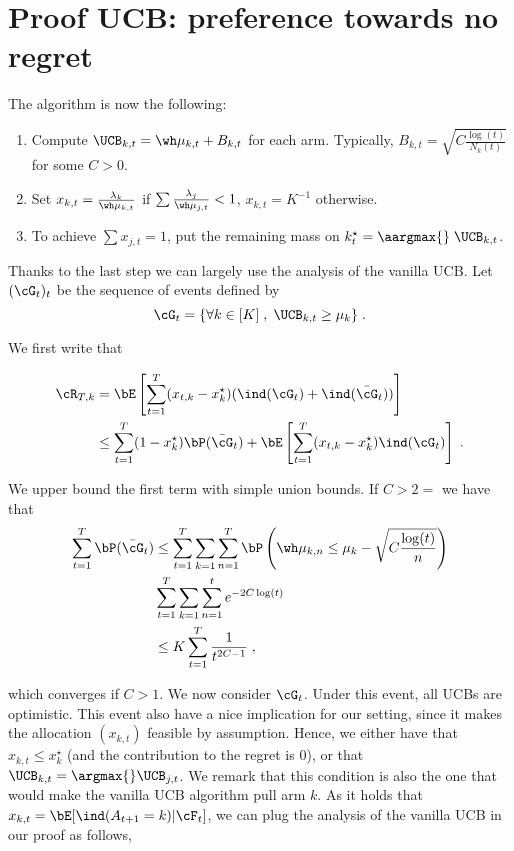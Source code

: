 \section{Proof UCB: preference towards no regret}

The algorithm is now the following:
\begin{enumerate}
	\item Compute $\UCB_{k, t} = \wh \mu_{k, t} + B_{k, t}$ for each arm. Typically, $B_{k, t}=\sqrt{C\frac{\log(t)}{N_k(t)}}$ for some $C>0$.
	\item Set $x_{k,t} = \frac{\lambda_k}{\wh \mu_{k, t}}$ if $\sum \frac{\lambda_j}{\wh \mu_{j, t}}<1$, $x_{k, t}=K^{-1}$ otherwise.
	\item To achieve $\sum x_{j, t}=1$, put the remaining mass on $k_t^\star=\aargmax{} \; \UCB_{k, t}$.
\end{enumerate}

Thanks to the last step we can largely use the analysis of the vanilla UCB. Let $(\cG_t)_t$ be the sequence of events defined by 
\[\cG_t = \{\forall k \in [K]\;, \; \UCB_{k, t}\geq \mu_k\} \;. \]

We first write that

\begin{align*}
\cR_{T,k} &= \bE\left[\sum_{t=1}^T (x_{t, k} - x^\star_k)(\ind(\cG_t)+\ind(\bar \cG_t))\right] \\
& \leq \sum_{t=1}^T (1-x_k^\star) \bP(\bar \cG_t) + \bE\left[\sum_{t=1}^T (x_{t,k} - x_k^\star)\ind(\cG_t)\right] \;.
\end{align*}

We upper bound the first term with simple union bounds. If $C>2=$ we have that 
\begin{align*}
\sum_{t=1}^T \bP(\bar \cG_t) &\leq \sum_{t=1}^T \sum_{k=1} \sum_{n=1}^{T}\bP\left(\wh \mu_{k,n}\leq \mu_k - \sqrt{C\frac{\log(t)}{n}}\right) \\
& \sum_{t=1}^T \sum_{k=1} \sum_{n=1}^{t}e^{-2C \log(t)} \\
& \leq K\sum_{t=1}^T \frac{1}{t^{2C-1}}\;,
\end{align*}

which converges if $C>1$. We now consider $\cG_t$. Under this event, all UCBs are optimistic. This event also have a nice implication for our setting, since it makes the allocation $(x_{k,t})$ feasible by assumption. Hence, we either have that $x_{k,t}\leq x_k^\star$ (and the contribution to the regret is $0$), or that $\UCB_{k,t}=\argmax{} \UCB_{j, t}$. We remark that this condition is also the one that would make the vanilla UCB algorithm pull arm $k$. As it holds that $x_{k,t} = \bE[\ind(A_{t+1}=k)|\cF_t]$, we can plug the analysis of the vanilla UCB in our proof as follows,

